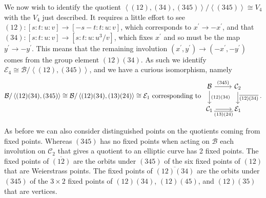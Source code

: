 \documentclass{amsart}
\newcommand{\pangle}[1]{\left\langle #1 \right\rangle}
\begin{document}
We now wish to identify the quotient $\pangle{(12), (34), (345)}/\pangle{(345)}\cong V_4$
with the  $V_4$ just described. It requires a little effort to see $(12) : [s : t : u : v] \to [-s - t : t : u: v]$, which corresponds to $x^\prime \to -x^\prime$, and that $(34) : [s : t : u : v] \to [s : t : u: u^3/v]$, which fixes $x^\prime$ and so must be the map $y^\prime \to -y^\prime$. This means that the remaining involution $(x^\prime, y^\prime) \to (-x^\prime, -y^\prime)$ comes from the group element $(12)(34)$. As such we identify $\mathcal{E}_4 \cong \mathcal{B} / \pangle{(12), (345)}$, and we have a curious isomorphism, namely 
$$
\mathcal{B} / \pangle{(12)(34), (345)} \cong \mathcal{B} / \pangle{(12)(34), (13)(24)} \cong \mathcal{E}_1
\text{ corresponding to}\ 
\begin{tikzcd}
\mathcal{B}\arrow[r, "(345)"]\arrow[d, "(12)(34)"] &\mathcal{C}_2\arrow[d, "\overline{(12)(34)}"] \\
\mathcal{C}_1\arrow[r, "\overline{(13)(24)}" ']  &\mathcal{E}_1
\end{tikzcd}.
$$


As before we can also consider distinguished points on the quotients coming from fixed points. Whereas $(345)$ has no fixed points when acting on $\mathcal{B}$ each involution on $\mathcal{C}_2$ that gives a quotient to an elliptic curve has 2 fixed points. The fixed points of $\overline{(12)}$ are the orbits under $(345)$ of the six fixed points of $(12)$ that are Weierstrass points. The fixed points of $\overline{(12)(34)}$ are the orbits under $(345)$ of the $3 \times 2$ fixed points of $(12)(34)$, $(12)(45)$, and $(12)(35)$ that are vertices.

\end{document}
